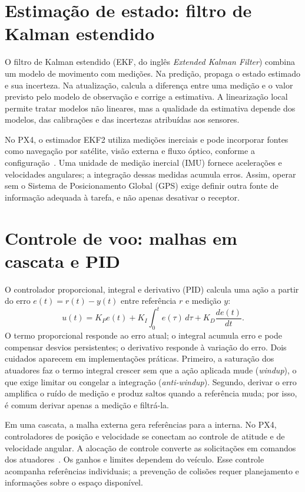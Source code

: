 \documentclass[11pt,a4paper,oneside]{book}
\numberwithin{equation}{chapter}
\begin{document}
\section{Estimação de estado: filtro de Kalman estendido}
O filtro de Kalman estendido (EKF, do inglês \emph{Extended Kalman Filter}) combina um modelo de movimento com medições. Na predição, propaga o estado estimado e sua incerteza. Na atualização, calcula a diferença entre uma medição e o valor previsto pelo modelo de observação e corrige a estimativa. A linearização local permite tratar modelos não lineares, mas a qualidade da estimativa depende dos modelos, das calibrações e das incertezas atribuídas aos sensores.

No PX4, o estimador EKF2 utiliza medições inerciais e pode incorporar fontes como navegação por satélite, visão externa e fluxo óptico, conforme a configuração~\cite{ekf}. Uma unidade de medição inercial (IMU) fornece acelerações e velocidades angulares; a integração dessas medidas acumula erros. Assim, operar sem o Sistema de Posicionamento Global (GPS) exige definir outra fonte de informação adequada à tarefa, e não apenas desativar o receptor.

\section{Controle de voo: malhas em cascata e PID}
O controlador proporcional, integral e derivativo (PID) calcula uma ação a partir do erro $e(t)=r(t)-y(t)$ entre referência $r$ e medição $y$:
\begin{equation}
 u(t)=K_Pe(t)+K_I\int_0^t e(\tau)\,d\tau+K_D\frac{de(t)}{dt}.
\end{equation}
O termo proporcional responde ao erro atual; o integral acumula erro e pode compensar desvios persistentes; o derivativo responde à variação do erro. Dois cuidados aparecem em implementações práticas. Primeiro, a saturação dos atuadores faz o termo integral crescer sem que a ação aplicada mude (\emph{windup}), o que exige limitar ou congelar a integração (\emph{anti-windup}). Segundo, derivar o erro amplifica o ruído de medição e produz saltos quando a referência muda; por isso, é comum derivar apenas a medição e filtrá-la.

Em uma cascata, a malha externa gera referências para a interna. No PX4, controladores de posição e velocidade se conectam ao controle de atitude e de velocidade angular. A alocação de controle converte as solicitações em comandos dos atuadores~\cite{controle}. Os ganhos e limites dependem do veículo. Esse controle acompanha referências individuais; a prevenção de colisões requer planejamento e informações sobre o espaço disponível.
\end{document}
